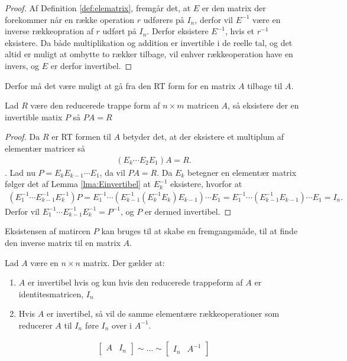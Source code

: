 \begin{proof}
Af Definition \ref{def:elematrix}, fremgår det, at $E$ er den matrix der forekommer når en række operation $r$ udførers på $I_n$, derfor vil $E^{-1}$ være en inverse rækkeopration af $r$ udført på $I_n$. %
Derfor eksistere $E^{-1}$, hvis et $r^{-1}$ eksistere. 
Da både multiplikation og addition er invertible i de reelle tal, og det altid er muligt at ombytte to rækker tilbage, vil enhver rækkeoperation have en invers, og $E$ er derfor invertibel.
\end{proof}
Derfor må det være muligt at gå fra den RT form for en matrix $A$ tilbage til $A$.
\begin{lma}
Lad $R$ være den reducerede trappe form af $n\times m$ matricen $A$, så eksistere der en invertible matix $P$ så $PA = R$
\label{lma:PA=R}
\end{lma}
\begin{proof}
Da $R$ er RT formen til $A$ betyder det, at der eksistere et multiplum af elementær matricer så
\begin{align*}
\left( E_k \dotsm E_2 E_1 \right) A = R.
\end{align*}.
Lad nu $P = E_k E_{k-1} \dotsm E_1$, da vil $PA = R$.
Da $E_k$ betegner en elementær matrix følger det af Lemma \ref{lma:Einvertibel} at $E_k^{-1}$ eksistere, hvorfor at 
\begin{align*}
\left( E_1^{-1}\dotsm E_{k-1}^{-1} E_k^{-1} \right) P = E_1^{-1}\dotsm \left( E_{k-1}^{-1}\left( E_k^{-1}E_k \right) E_{k-1}\right)\dotsm E_1 = E_1^{-1}\dotsm \left( E_{k-1}^{-1}  E_{k-1} \right) \dotsm E_1 = I_n.
\end{align*}
Derfor vil $E_1^{-1}\dotsm E_{k-1}^{-1} E_k^{-1} = P^{-1}$, og $P$ er dermed invertibel.
\end{proof}
Eksistensen af matircen $P$ kan bruges til at skabe en fremgangsmåde, til at finde den inverse matrix til en matrix $A$.
\begin{stn}
Lad $A$ være en $n \times n$ matrix. Der gælder at: 
\begin{enumerate}[label=(\alph*)]
\item $A$ er invertibel hvis og kun hvis den reducerede trappeform af $A$ er identitesmatricen, $I_n$
\item Hvis $A$ er invertibel, så vil de samme elementære rækkeoperationer som reducerer $A$ til $I_n$ føre $I_n$ over i $A^{-1}$.  
\end{enumerate}
\begin{align*}
\begin{bmatrix}
A & I_n
\end{bmatrix} \sim \dots \sim
\begin{bmatrix}
I_n & A^{-1}
\end{bmatrix}
\end{align*}
\label{stn:inversmatrix}
\end{stn}
